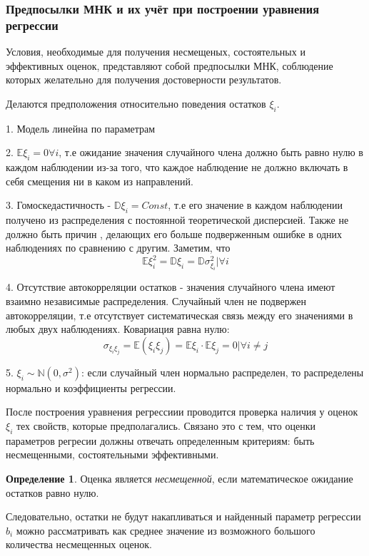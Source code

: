 \documentclass[aps,%
12pt,%
final,%
oneside,
onecolumn,%
musixtex, %
superscriptaddress,%
centertags]{article} %
\theoremstyle{plain}
\theoremstyle{definition}
\newtheorem{definition}{Определение}[subsection]
\theoremstyle{remark}
\begin{document}
\subsubsection{Предпосылки МНК и их учёт при построении уравнения регрессии}

Условия, необходимые для получения несмещеных, состоятельных и эффективных оценок, представляют собой предпосылки МНК, соблюдение которых желательно для получения достоверности результатов.

Делаются предположения относительно поведения остатков $\xi_i$.

1. Модель линейна по параметрам

2. $\mathbb{E}\xi_i = 0 \forall i$, т.е ожидание значения случайного члена должно быть равно нулю в каждом наблюдении из-за того, что каждое наблюдение не должно включать в себя смещения ни в каком из направлений.

3. Гомоскедастичность - $\mathbb{D}\xi_i = Const $, т.е его значение в каждом наблюдении получено из распределения с постоянной теоретической дисперсией. Также не должно быть причин , делающих его больше подверженным ошибке в одних наблюдениях по сравнению с другим. Заметим, что $$\mathbb{E}\xi_i^2 = \mathbb{D}\xi_i = \mathbb{D}\sigma_{\xi_i}^2 | \forall i $$

4. Отсутствие автокорреляции остатков - значения случайного члена имеют взаимно независимые распределения. Случайный член не подвержен автокорреляции, т.е отсутствует систематическая связь между его значениями в любых двух наблюдениях.
Ковариация равна нулю:
$$ \sigma_{\xi_{i}\xi_{j}} = \mathbb{E}(\xi_i\xi_j) = \mathbb{E}\xi_i \cdot \mathbb{E}\xi_j = 0 | \forall i \neq j $$

5. $\xi_i \sim \mathbb{N}(0,\sigma^2)$: если случайный член нормально распределен, то распределены нормально и коэффициенты регрессии.

После построения уравнения регрессиии проводится проверка наличия у оценок $\xi_i$ тех свойств, которые предполагались. Связано это с тем, что оценки параметров регресии должны отвечать определенным критериям: быть несмещенными, состоятельными эффективными.

\begin{definition}
	Оценка является \textit{несмещенной}, если математическое ожидание остатков равно нулю.
\end{definition}

Следовательно, остатки не будут накапливаться и найденный параметр регрессии $b_i$ можно рассматривать как среднее значение из возможного большого количества несмещенных оценок.
\end{document}
